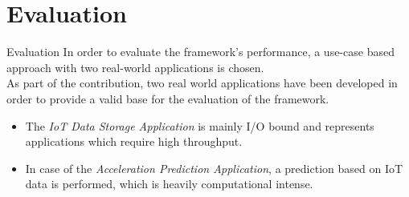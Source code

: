 \documentclass[10pt]{beamer}
\begin{document}
{ %
    \begin{frame}[plain]
     \end{frame}
}

\section{Evaluation}
\begin{frame}{Evaluation}
In order to evaluate the framework's performance, a use-case based approach with two real-world applications is chosen.\\
As part of the contribution, two real world applications have been developed in order to provide a valid base for the evaluation of the framework.
\hfill

    \begin{itemize}
        \item The \textit{IoT Data Storage Application} is mainly I/O bound and represents applications which require high throughput.
        \item In case of the \textit{Acceleration Prediction Application}, a prediction based on IoT data is performed, which is heavily computational intense.\\
    \end{itemize}
\end{frame}
\end{document}
